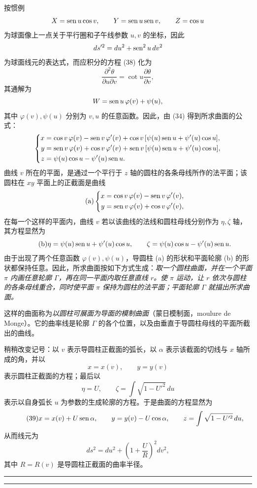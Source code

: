 按惯例
\[
 X=\operatorname{sen} u\cos v,
 \qquad
 Y=\operatorname{sen} u\operatorname{sen} v,
 \qquad
 Z=\cos u
\]
为球面像上一点关于平行圈和子午线参数 \(u,v\) 的坐标，因此
\[
 ds'^2=du^2+\operatorname{sen}^2u\,dv^2
\]
为球面线元的表达式，而应积分的方程 (38) 化为
\[
 \frac{\partial^2\theta}{\partial u\partial v}=\cot u\frac{\partial\theta}{\partial v},
\]
其通解为
\[
 W=\operatorname{sen} u\,\varphi(v)+\psi(u),
\]
其中 \(\varphi(v),\psi(u)\) 分别为 \(v,u\) 的任意函数。因此，由 (34) 得到所求曲面的公式：
\[
\left\{\begin{aligned}
 x&=\cos v\,\varphi(v)-\operatorname{sen} v\,\varphi'(v)+\cos v\,[\psi(u)\operatorname{sen} u+\psi'(u)\cos u],\\
 y&=\operatorname{sen} v\,\varphi(v)+\cos v\,\varphi'(v)+\operatorname{sen} v\,[\psi(u)\operatorname{sen} u+\psi'(u)\cos u],\\
 z&=\psi(u)\cos u-\psi'(u)\operatorname{sen} u.
\end{aligned}\right.
\]
曲线 \(v\) 所在的平面，是通过一个平行于 \(z\) 轴的圆柱的各条母线所作的法平面；该圆柱在 \(xy\) 平面上的正截面是曲线
\begin{equation}\tag{a}
\left\{\begin{aligned}
 x&=\cos v\,\varphi(v)-\operatorname{sen} v\,\varphi'(v),\\
 y&=\operatorname{sen} v\,\varphi(v)+\cos v\,\varphi'(v),
\end{aligned}\right.
\end{equation}
在每一个这样的平面内，曲线 \(v\) 若以该曲线的法线和圆柱母线分别作为 \(\eta,\zeta\) 轴，其方程显然为
\begin{equation}\tag{b}
 \eta=\psi(u)\operatorname{sen} u+\psi'(u)\cos u,
 \qquad
 \zeta=\psi(u)\cos u-\psi'(u)\operatorname{sen} u.
\end{equation}
由于出现了两个任意函数 \(\varphi(v),\psi(u)\)，导圆柱 (a) 的形状和平面轮廓 (b) 的形状都保持任意。因此，所求曲面按如下方式生成：\emph{取一个圆柱曲面，并在一个平面 \(\pi\) 内画任意轮廓 \(\Gamma\)，再在同一平面内取任意直线 \(r\)。使 \(\pi\) 运动，让 \(r\) 依次与圆柱的各条母线重合，同时使平面 \(\pi\) 保持为圆柱的法平面；平面轮廓 \(\Gamma\) 就描出所求曲面。}

这样的曲面称为\emph{以圆柱可展面为导面的模制曲面}（蒙日模制面，moulure de Monge）。它的曲率线是轮廓 \(\Gamma\) 的各个位置，以及由垂直于导圆柱母线的平面所截出的曲线。

稍稍改变记号：以 \(v\) 表示导圆柱正截面的弧长，以 \(\alpha\) 表示该截面的切线与 \(x\) 轴所成的角，并以
\[
 x=x(v),\qquad y=y(v)
\]
表示圆柱正截面的方程；最后以
\[
 \eta=U,
 \qquad
 \zeta=\int\sqrt{1-U'^2}\,du
\]
表示以自身弧长 \(u\) 为参数的生成轮廓的方程。于是曲面的方程显然为
\begin{equation}\tag{39}
 x=x(v)+U\operatorname{sen}\alpha,
 \qquad y=y(v)-U\cos\alpha,
 \qquad z=\int\sqrt{1-U'^2}\,du,
\end{equation}
从而线元为
\[
 ds^2=du^2+\left(1+\frac{U}{R}\right)^2dv^2,
\]
其中 \(R=R(v)\) 是导圆柱正截面的曲率半径。

\begin{center}
\rule{1.8em}{0.4pt}\hspace{0.18em}\textbullet\textbullet\textbullet\hspace{0.18em}\rule{1.8em}{0.4pt}
\end{center}
